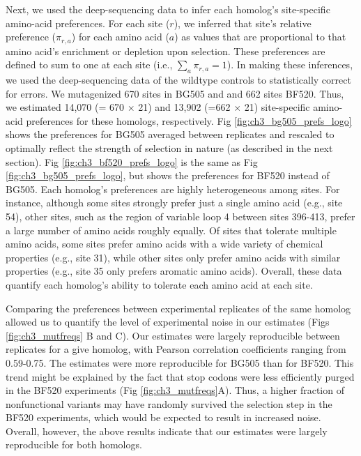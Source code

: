 \documentclass[9pt]{elife}
\begin{document}
Next, we used the deep-sequencing data to infer each homolog's site-specific amino-acid preferences.
For each site ($r$), we inferred that site's relative preference ($\pi_{r,a}$) for each amino acid ($a$) as values that are proportional to that amino acid's enrichment or depletion upon selection.
These preferences are defined to sum to one at each site (i.e., $\sum_{a} \pi_{r,a} = 1$).
In making these inferences, we used the deep-sequencing data of the wildtype controls to statistically correct for errors.
We mutagenized 670 sites in BG505 and and 662 sites BF520.
Thus, we estimated 14,070 (= 670 $\times$ 21) and 13,902 (=662 $\times$ 21) site-specific amino-acid preferences for these homologs, respectively.
Fig \ref{fig:ch3_bg505_prefs_logo} shows the preferences for BG505 averaged between replicates and rescaled to optimally reflect the strength of selection in nature (as described in the next section).
Fig \ref{fig:ch3_bf520_prefs_logo} is the same as Fig \ref{fig:ch3_bg505_prefs_logo}, but shows the preferences for BF520 instead of BG505.
Each homolog's preferences are highly heterogeneous among sites.
For instance, although some sites strongly prefer just a single amino acid (e.g., site 54), other sites, such as the region of variable loop 4 between sites 396-413, prefer a large number of amino acids roughly equally.
Of sites that tolerate multiple amino acids, some sites prefer amino acids with a wide variety of chemical properties (e.g., site 31), while other sites only prefer amino acids with similar properties (e.g., site 35 only prefers aromatic amino acids).
Overall, these data quantify each homolog's ability to tolerate each amino acid at each site.

Comparing the preferences between experimental replicates of the same homolog allowed us to quantify the level of experimental noise in our estimates (Figs \ref{fig:ch3_mutfreqs} B and C).
Our estimates were largely reproducible between replicates for a give homolog, with Pearson correlation coefficients ranging from 0.59-0.75.
The estimates were more reproducible for BG505 than for BF520.
This trend might be explained by the fact that stop codons were less efficiently purged in the BF520 experiments (Fig \ref{fig:ch3_mutfreqs}A).
Thus, a higher fraction of nonfunctional variants may have randomly survived the selection step in the BF520 experiments, which would be expected to result in increased noise.
Overall, however, the above results indicate that our estimates were largely reproducible for both homologs.
\end{document}
